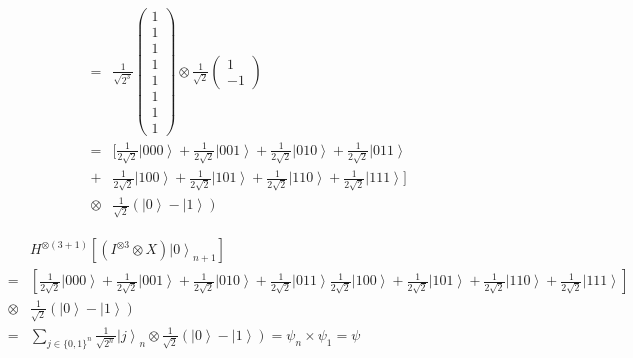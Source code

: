 \begin{frame}
	\begin{exampleblock}{}
		\begin{eqnarray}
			&=&\frac{1}{\sqrt{2^{3}}}\left(\begin{array}{c}
			1\\
			1\\
			1\\
			1\\
			1\\
			1\\
			1\\
			1
			\end{array}\right)\otimes\frac{1}{\sqrt{2}}\left(\begin{array}{c}
			1\\
			-1
			\end{array}\right)\\
			&=&[ \frac{1}{2\sqrt{2}}\left.|000\right\rangle +\frac{1}{2\sqrt{2}}\left.|001\right\rangle +\frac{1}{2\sqrt{2}}\left.|010\right\rangle +\frac{1}{2\sqrt{2}}\left.|011\right\rangle \\&+&\frac{1}{2\sqrt{2}}\left.|100\right\rangle +\frac{1}{2\sqrt{2}}\left.|101\right\rangle +\frac{1}{2\sqrt{2}}\left.|110\right\rangle +\frac{1}{2\sqrt{2}}\left.|111\right\rangle] \\&\otimes&\frac{1}{\sqrt{2}}\left(\left.|0\right\rangle -\left.|1\right\rangle \right)			
		\end{eqnarray}
	\end{exampleblock}
\end{frame}

\begin{frame}{}
	\begin{exampleblock}{}
		\begin{eqnarray}
			&&H^{\otimes\left(3+1\right)}\left[(I^{\otimes3}\otimes X)\left.|0\right\rangle _{n+1}\right]\\&=&\left[\frac{1}{2\sqrt{2}}\left.|000\right\rangle +\frac{1}{2\sqrt{2}}\left.|001\right\rangle +\frac{1}{2\sqrt{2}}\left.|010\right\rangle +\frac{1}{2\sqrt{2}}\left.|011\right\rangle \frac{1}{2\sqrt{2}}\left.|100\right\rangle +\frac{1}{2\sqrt{2}}\left.|101\right\rangle +\frac{1}{2\sqrt{2}}\left.|110\right\rangle +\frac{1}{2\sqrt{2}}\left.|111\right\rangle \right]\\&\otimes&\frac{1}{\sqrt{2}}\left(\left.|0\right\rangle -\left.|1\right\rangle \right)\\&=&\sum_{j\in\{0,1\}^{n}}\frac{1}{\sqrt{2^{n}}}\left.|j\right\rangle _{n}\otimes\frac{1}{\sqrt{2}}\left(\left.|0\right\rangle -\left.|1\right\rangle \right)=\psi_{n}\times\psi_{1}=\psi
		\end{eqnarray}
	\end{exampleblock}
\end{frame}

